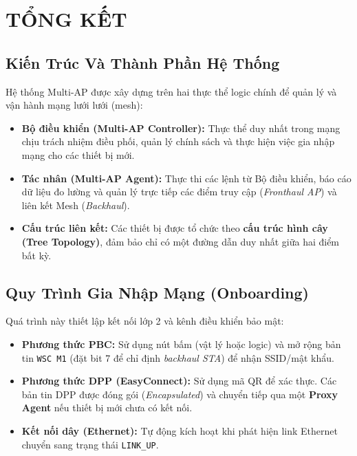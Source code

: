 \chapter{TỔNG KẾT}
\label{chapter:conclusion}

\section{Kiến Trúc Và Thành Phần Hệ Thống}
Hệ thống Multi-AP được xây dựng trên hai thực thể logic chính để quản lý và vận hành mạng lưới lưới (mesh):
\begin{itemize}
	\item \textbf{Bộ điều khiển (Multi-AP Controller):} Thực thể duy nhất trong mạng chịu trách nhiệm điều phối, quản lý chính sách và thực hiện việc gia nhập mạng cho các thiết bị mới.
	\item \textbf{Tác nhân (Multi-AP Agent):} Thực thi các lệnh từ Bộ điều khiển, báo cáo dữ liệu đo lường và quản lý trực tiếp các điểm truy cập (\textit{Fronthaul AP}) và liên kết Mesh (\textit{Backhaul}).
	\item \textbf{Cấu trúc liên kết:} Các thiết bị được tổ chức theo \textbf{cấu trúc hình cây (Tree Topology)}, đảm bảo chỉ có một đường dẫn duy nhất giữa hai điểm bất kỳ.
\end{itemize}

\section{Quy Trình Gia Nhập Mạng (Onboarding)}
Quá trình này thiết lập kết nối lớp 2 và kênh điều khiển bảo mật:
\begin{itemize}
	\item \textbf{Phương thức PBC:} Sử dụng nút bấm (vật lý hoặc logic) và mở rộng bản tin \texttt{WSC M1} (đặt bit 7 để chỉ định \textit{backhaul STA}) để nhận SSID/mật khẩu.
	\item \textbf{Phương thức DPP (EasyConnect):} Sử dụng mã QR để xác thực. Các bản tin DPP được đóng gói (\textit{Encapsulated}) và chuyển tiếp qua một \textbf{Proxy Agent} nếu thiết bị mới chưa có kết nối.
	\item \textbf{Kết nối dây (Ethernet):} Tự động kích hoạt khi phát hiện link Ethernet chuyển sang trạng thái \texttt{LINK\_UP}.
\end{itemize}


